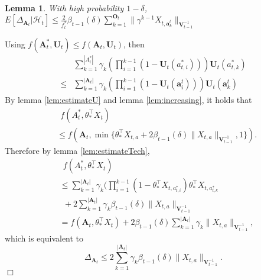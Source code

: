 \documentclass{article}
\newcommand{\bA}{\mathbf{A}}
\newcommand{\ba}{\mathbf{a}}
\newcommand{\bO}{\mathbf{O}}
\newcommand{\bU}{\mathbf{U}}
\newcommand{\bV}{\mathbf{V}}
\newcommand{\cH}{\mathcal{H}}
\newcommand{\abs}[1]{\left| #1 \right|}
\newcommand{\norm}[1]{\| #1 \|}
\newtheorem{lemma}[theorem]{Lemma}%
\newenvironment{proof}{\noindent {\textbf{Proof. }}}{$\Box$ \medskip}
\begin{document}
	\begin{lemma}
		With high probability $1-\delta$, $E[\Delta_{\bA_t}|\cH_t] \leq \frac{2}{f_t^*} \beta_{t-1}(\delta)\sum_{k=1}^{\bO_t}\norm{\gamma^{k-1}X_{t,\ba_k^t}}_{\bV_{t-1}^{-1}}$
	\end{lemma}
	\begin{proof}
		Using $f(\bA_t^*,\bU_t) \leq f(\bA_t,\bU_t)$, then
		\begin{align*}
		&\sum_{k=1}^{\abs{A_t^*}}\gamma_k (\prod_{i=1}^{k-1}(1 -\bU_t(a_{t,i}^*)))\bU_t(a_{t,k}^*) \\
		\leq &\sum_{k=1}^{\abs{\bA_t}}\gamma_k (\prod_{i=1}^{k-1}(1 -\bU_t(\ba_i^t)))\bU_t(\ba_k^t) 
		\end{align*}
		By lemma \ref{lem:estimateU} and lemma \ref{lem:increasing}, it holds that
		\begin{align*}
		&~~f(A_t^*, \theta_*^{\top}X_t) \\
		&\leq f(\bA_t, \min\{\theta_*^{\top}X_{t,a}+2\beta_{t-1}(\delta)\norm{X_{t,a}}_{\bV_{t-1}^{-1}},1\}).
		\end{align*}
		Therefore by lemma \ref{lem:estimateTech},
		\begin{align*}
		&~~f(A_t^*, \theta_*^{\top}X_t) \\
		&\leq  \sum_{k=1}^{\abs{\bA_t}}\gamma_k (\prod_{i=1}^{k-1}(1 -\theta_*^{\top}X_{t,a_{t,i}^*})\theta_*^{\top}X_{t,a_{t,k}^*} \\
		&~~ + 2\sum_{k=1}^{\abs{\bA_t}}\gamma_k\beta_{t-1}(\delta)\norm{X_{t,a}}_{\bV_{t-1}^{-1}}\\
		&=f(\bA_t, \theta_*^{\top}X_t) + 2\beta_{t-1}(\delta)\sum_{k=1}^{\abs{\bA_t}}\gamma_k\norm{X_{t,a}}_{\bV_{t-1}^{-1}},
		\end{align*}
		which is equivalent to 
		$$
		\Delta_{\bA_t} \leq 2\sum_{k=1}^{\abs{\bA_t}}\gamma_k\beta_{t-1}(\delta)\norm{X_{t,a}}_{\bV_{t-1}^{-1}}.
		$$
	\end{proof}
	
\end{document}
